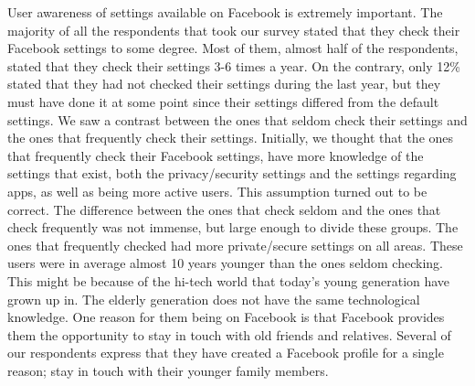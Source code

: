 User awareness of settings available on Facebook is extremely important. The majority of all the respondents that took our survey stated that they check their Facebook settings to some degree. Most of them, almost half of the respondents, stated that they check their settings 3-6 times a year. On the contrary, only 12\% stated that they had not checked their settings during the last year, but they must have done it at some point since their settings differed from the default settings. We saw a contrast between the ones that seldom check their settings and the ones that frequently check their settings. Initially, we 
thought that the ones that frequently check their Facebook settings, have more knowledge of the settings that exist, both the privacy/security settings and the settings regarding apps, as well as being more active users. This assumption turned out to be correct. The difference between the ones that check seldom and the ones that check frequently was not immense, but large enough to divide these groups. The ones that frequently checked had more private/secure settings on all areas. These users were in average almost 10 years younger than the ones seldom checking. This might be because of the hi-tech world that today's young generation have grown up in. The elderly generation does not have the same technological knowledge. One reason for them being on Facebook is that Facebook provides them the opportunity to stay in touch with old friends and relatives. Several of our respondents express that they have created a Facebook profile for a single reason; stay in touch with their younger family members. 

